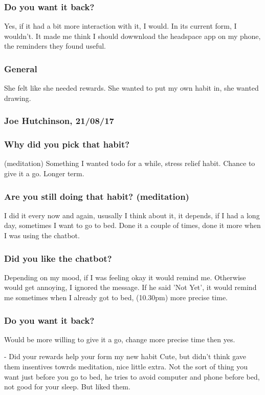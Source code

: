 \documentclass{scaffold/sigchi}
\begin{document}
\subsubsection{Do you want it back?}
Yes, if it had a bit more interaction with it, I would. In its current form, I wouldn't. It made me think I should dowwnload the headspace app on my phone, the reminders they found useful.

\subsubsection{General}
She felt like she needed rewards.
She wanted to put my own habit in, she wanted drawing.

\subsubsection{Joe Hutchinson, 21/08/17}

\subsubsection{Why did you pick that habit?} (meditation)
Something I wanted todo for a while, stress relief habit. Chance to give it a go. Longer term.

\subsubsection{Are you still doing that habit? (meditation)}
I did it every now and again, ususally I think about it, it depends, if I had a long day, sometimes I want to go to bed. Done it a couple of times, done it more when I was using the chatbot.

\subsubsection{Did you like the chatbot?}
Depending on my mood, if I was feeling okay it would remind me. Otherwise would get annoying, I ignored the message. If he said 'Not Yet', it would remind me sometimes when I already got to bed, (10.30pm) more precise time.

\subsubsection{Do you want it back?}
Would be more willing to give it a go, change more precise time then yes.

- Did your rewards help your form my new habit
Cute, but didn't think gave them insentives towrds meditation, nice little extra.
Not the sort of thing you want just before you go to bed, he tries to avoid computer and phone before bed, not good for your sleep. But liked them.
\end{document}
